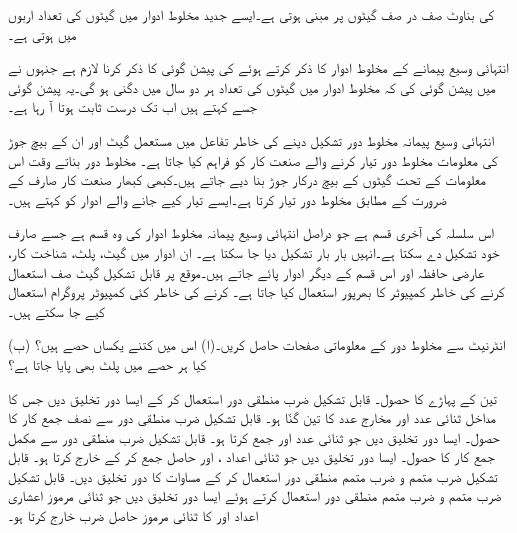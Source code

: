  کی بناوٹ صف در صف گیٹوں پر مبنی ہوتی ہے۔ایسے جدید مخلوط ادوار میں گیٹوں کی تعداد اربوں میں ہوتی ہے۔

انتہائی وسیع پیمانے کے مخلوط ادوار کا ذکر کرتے ہوئے  کی پیشن گوئی کا ذکر کرنا لازم ہے جنہوں نے  میں پیشن گوئی کی کہ مخلوط ادوار میں گیٹوں کی تعداد ہر دو سال میں دگنی ہو گی۔یہ پیشن گوئی جسے  کہتے ہیں اب تک درست ثابت ہوتا آ رہا ہے۔

انتہائی وسیع پیمانہ مخلوط دور تشکیل دینے کی خاطر تفاعل میں مستعمل گیٹ اور ان کے بیچ جوڑ کی معلومات مخلوط دور تیار کرنے والے صنعت کار کو فراہم کیا جاتا ہے۔ مخلوط دور بناتے وقت اس معلومات کے تحت گیٹوں کے بیچ درکار جوڑ بنا دیے جاتے ہیں۔کبھی کبھار صنعت کار صارف کے ضرورت کے مطابق مخلوط دور تیار کرتا ہے۔ایسے تیار کیے جانے والے ادوار کو کہتے ہیں۔

اس سلسلہ کی آخری قسم  ہے جو دراصل انتہائی وسیع پیمانہ مخلوط ادوار کی وہ قسم ہے جسے صارف خود تشکیل دے سکتا ہے۔انہیں بار بار تشکیل دیا جا سکتا ہے۔ ان ادوار میں گیٹ، پلٹ، شناخت کار، عارضی حافظہ اور اس قسم کے دیگر ادوار پائے جاتے ہیں۔موقع پر قابل تشکیل گیٹ صف استعمال کرنے کی خاطر کمپیوٹر کا بھرپور استعمال کیا جاتا ہے۔  کرنے کی خاطر کئی کمپیوٹر پروگرام استعمال کیے جا سکتے ہیں۔ 

انٹرنیٹ سے  مخلوط دور کے معلوماتی صفحات حاصل کریں۔(ا) اس میں کتنے یکساں حصے ہیں؟ (ب) کیا ہر حصے میں پلٹ بھی پایا جاتا ہے؟


تین کے  پہاڑے   کا  حصول۔ قابل تشکیل  ضرب   منطقی دور  استعمال کر کے ایسا دور تخلیق دیں جس کا مداخل ثنائی  عدد   اور مخارج    عدد کا تین گنّا ہو۔
 قابل  تشکیل ضرب منطقی دور سے نصف  جمع کار کا حصول۔  ایسا دور تخلیق دیں جو ثنائی  عدد  اور   جمع کرتا ہو۔
 قابل  تشکیل ضرب منطقی دور سے مکمل   جمع کار کا حصول۔  ایسا دور تخلیق دیں جو ثنائی  اعداد ،  اور حاصل   جمع کر کے  خارج کرتا ہو۔
قابل تشکیل     ضرب متمم و ضرب متمم منطقی دور استعمال کر کے مساوات   کا دور تخلیق دیں۔
قابل تشکیل ضرب متمم و ضرب متمم منطقی دور استعمال کرتے ہوئے ایسا دور تخلیق دیں جو ثنائی مرموز اعشاری اعداد   اور    کا ثنائی مرموز  حاصل ضرب خارج   کرتا  ہو۔

